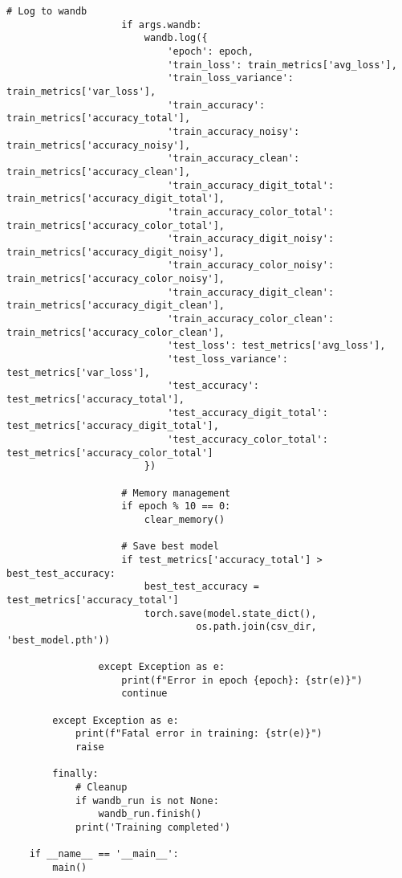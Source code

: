 \begin{lstlisting}[style=pythonstyle, caption={メインコード}]
                    # Log to wandb
                    if args.wandb:
                        wandb.log({
                            'epoch': epoch,
                            'train_loss': train_metrics['avg_loss'],
                            'train_loss_variance': train_metrics['var_loss'],
                            'train_accuracy': train_metrics['accuracy_total'],
                            'train_accuracy_noisy': train_metrics['accuracy_noisy'],
                            'train_accuracy_clean': train_metrics['accuracy_clean'],
                            'train_accuracy_digit_total': train_metrics['accuracy_digit_total'],
                            'train_accuracy_color_total': train_metrics['accuracy_color_total'],
                            'train_accuracy_digit_noisy': train_metrics['accuracy_digit_noisy'],
                            'train_accuracy_color_noisy': train_metrics['accuracy_color_noisy'],
                            'train_accuracy_digit_clean': train_metrics['accuracy_digit_clean'],
                            'train_accuracy_color_clean': train_metrics['accuracy_color_clean'],
                            'test_loss': test_metrics['avg_loss'],
                            'test_loss_variance': test_metrics['var_loss'],
                            'test_accuracy': test_metrics['accuracy_total'],
                            'test_accuracy_digit_total': test_metrics['accuracy_digit_total'],
                            'test_accuracy_color_total': test_metrics['accuracy_color_total']
                        })
    
                    # Memory management
                    if epoch % 10 == 0:
                        clear_memory()
    
                    # Save best model
                    if test_metrics['accuracy_total'] > best_test_accuracy:
                        best_test_accuracy = test_metrics['accuracy_total']
                        torch.save(model.state_dict(), 
                                 os.path.join(csv_dir, 'best_model.pth'))
    
                except Exception as e:
                    print(f"Error in epoch {epoch}: {str(e)}")
                    continue
    
        except Exception as e:
            print(f"Fatal error in training: {str(e)}")
            raise
        
        finally:
            # Cleanup
            if wandb_run is not None:
                wandb_run.finish()
            print('Training completed')
    
    if __name__ == '__main__':
        main()
\end{lstlisting}
